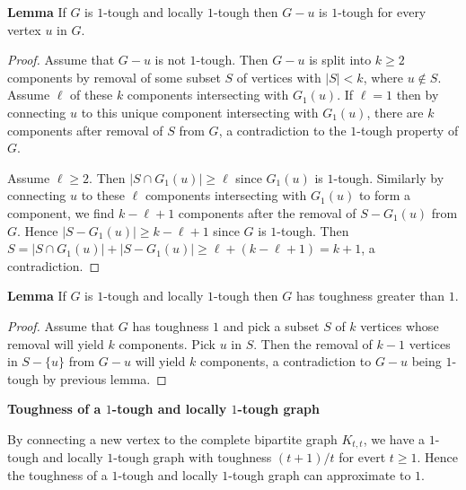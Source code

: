 \documentclass{beamer}
\theoremstyle{plain}
\theoremstyle{definition}
\begin{document}
\begin{frame}{\bf Lemma}
If $G$ is $1$-tough and locally $1$-tough then $G-u$ is $1$-tough for every vertex $u$ in $G$.

\begin{proof}
Assume that $G-u$ is not $1$-tough. Then $G-u$ is split into $k\geq 2$ components by removal of some subset $S$ of vertices with $|S|<k$, where $u\not\in S$. Assume $\ell$ of these $k$ components intersecting with $G_1(u)$. If $\ell=1$ then by connecting $u$ to this unique component intersecting with $G_1(u)$, there are $k$ components after removal of $S$ from $G$, a contradiction to the $1$-tough property of $G$.
\medskip

Assume $\ell\geq 2$. Then  $|S\cap G_1(u)|\geq \ell$ since $G_1(u)$ is $1$-tough.
Similarly by connecting $u$ to these $\ell$ components intersecting with $G_1(u)$ to form a component, we find $k-\ell+1$ components
after the removal of $S-G_1(u)$ from $G$.  Hence $|S-G_1(u)|\geq k-\ell+1$ since $G$ is $1$-tough.
Then $S=|S\cap G_1(u)|+|S-G_1(u)|\geq \ell+(k-\ell+1)=k+1$, a contradiction.
\end{proof}

\end{frame}


\begin{frame}{\bf Lemma}
If $G$ is $1$-tough and locally $1$-tough then $G$ has toughness greater than $1$.

\begin{proof}
Assume that $G$ has toughness $1$ and pick a subset $S$ of $k$ vertices whose removal will yield $k$ components. Pick $u$ in $S$.
Then the removal of $k-1$ vertices in $S-\{u\}$ from $G-u$ will yield $k$ components, a contradiction to $G-u$ being $1$-tough by previous lemma.
\end{proof}
\end{frame}

\begin{frame}{\bf Toughness of a $1$-tough and locally $1$-tough graph}

By connecting a new vertex to the complete bipartite graph $K_{t, t}$, we have a $1$-tough and locally $1$-tough graph with toughness $(t+1)/t$ for evert $t\geq 1$. Hence the toughness of a $1$-tough and locally $1$-tough graph can approximate to $1$.

\end{frame}
\end{document}
